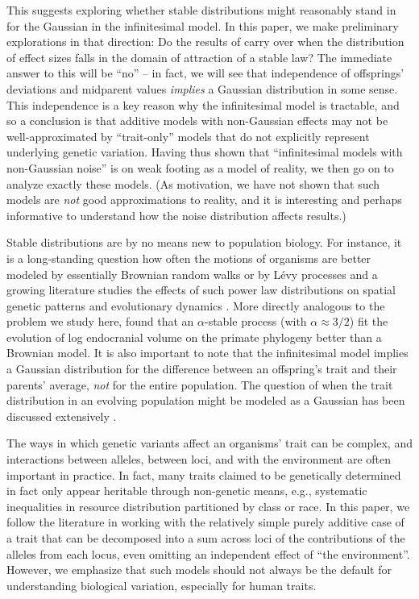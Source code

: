 \documentclass{article}
\newcommand{\1}{\mathbbm{1}}
\theoremstyle{remark}
\theoremstyle{definition}
\begin{document}
This suggests exploring whether stable distributions might reasonably stand in for the Gaussian
in the infinitesimal model.  
In this paper, we make preliminary explorations in that direction:
Do the results of \citet{barton2017infinitesimal}
carry over when the distribution of effect sizes falls in the domain of attraction of a stable law?
The immediate answer to this will be ``no'' --
in fact, we will see that independence of offsprings' deviations and midparent values \emph{implies} a Gaussian distribution in some sense.
This independence is a key reason why the infinitesimal model is tractable,
and so a conclusion is that additive models with non-Gaussian effects may not be well-approximated
by ``trait-only'' models that do not explicitly represent underlying genetic variation.
Having thus shown that ``infinitesimal models with non-Gaussian noise'' is on weak footing as a model of reality,
we then go on to analyze exactly these models.
(As motivation,
we have not shown that such models are \emph{not} good approximations to reality,
and it is interesting and perhaps informative to understand how the noise distribution affects results.)

Stable distributions are by no means new to population biology.
For instance, it is a long-standing question how often the motions of organisms
are better modeled by essentially Brownian random walks or by L\'evy processes \citep{benhamou2007animals}
and a growing literature studies the effects of such power law distributions
on spatial genetic patterns and evolutionary dynamics
\citep[e.g.,][]{paulose2019spatial,smith2023isolation}.
More directly analogous to the problem we study here, \citet{landis2012phylogenetic}
found that an $\alpha$-stable process (with $\alpha \approx 3/2$) fit the evolution of log endocranial volume
on the primate phylogeny
better than a Brownian model.
It is also important to note that
the infinitesimal model implies a Gaussian distribution for the difference between an offspring's trait and their parents' average,
\emph{not} for the entire population.
The question of when the trait distribution in an evolving population
might be modeled as a Gaussian has been discussed extensively
\citep[e.g.,][]{turelli1994genetic,dbarre2015evolution}.

The ways in which genetic variants affect an organisms' trait can be complex,
and interactions between alleles, between loci, and with the environment are often important in practice.
In fact, many traits claimed to be genetically determined 
in fact only appear heritable through non-genetic means,
e.g., systematic inequalities in resource distribution partitioned by class or race.
In this paper, we follow the literature in working with the relatively simple purely additive case
of a trait that can be decomposed into a sum across loci of the contributions of the alleles from each locus,
even omitting an independent effect of ``the environment''.
However, we emphasize that such models should not always be the default for understanding biological variation,
especially for human traits.
\end{document}
